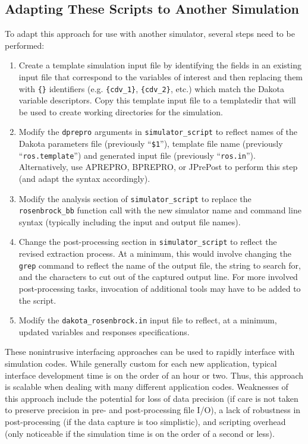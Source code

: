 \subsection{Adapting These Scripts to Another Simulation}

To adapt this approach for use with another simulator, several steps
need to be performed:

\begin{enumerate}
\item Create a template simulation input file by identifying the fields
  in an existing input file that correspond to the variables of
  interest and then replacing them with \texttt{\{\}} identifiers
  (e.g. \texttt{\{cdv\_1\}}, \texttt{\{cdv\_2\}}, etc.) which match
  the Dakota variable descriptors. Copy this template input file to a
  templatedir that will be used to create working directories for the
  simulation.

\item Modify the \texttt{dprepro} arguments in
  \texttt{simulator\_script} to reflect names of the Dakota parameters
  file (previously ``\texttt{\$1}''), template file name
  (previously ``\texttt{ros.template}'') and generated input file
  (previously ``\texttt{ros.in}''). Alternatively, use APREPRO,
  BPREPRO, or JPrePost to perform this step (and adapt the syntax
  accordingly).

\item Modify the analysis section of \texttt{simulator\_script} to
  replace the \texttt{rosenbrock\_bb} function call with the new
  simulator name and command line syntax (typically including the
  input and output file names).

\item Change the post-processing section in \texttt{simulator\_script}
  to reflect the revised extraction process. At a minimum, this would
  involve changing the \texttt{grep} command to reflect the name of
  the output file, the string to search for, and the characters to cut
  out of the captured output line. For more involved post-processing
  tasks, invocation of additional tools may have to be added to the
  script.

\item Modify the \texttt{dakota\_rosenbrock.in} input file to reflect,
  at a minimum, updated variables and responses specifications.
\end{enumerate}

These nonintrusive interfacing approaches can be used to rapidly
interface with simulation codes. While generally custom for each new
application, typical interface development time is on the order of an
hour or two. Thus, this approach is scalable when dealing with many
different application codes. Weaknesses of this approach include the
potential for loss of data precision (if care is not taken to preserve
precision in pre- and post-processing file I/O), a lack of robustness
in post-processing (if the data capture is too simplistic), and
scripting overhead (only noticeable if the simulation time is on the
order of a second or less).

